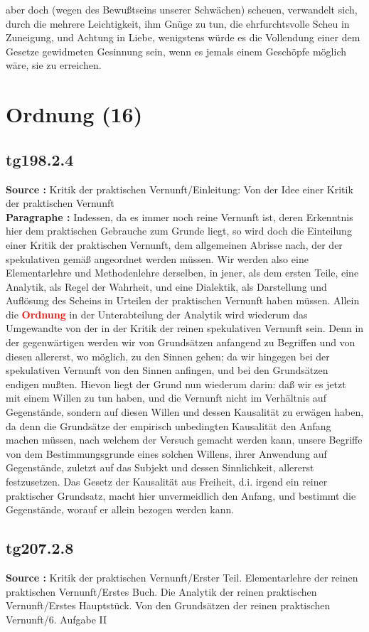 \documentclass[a4paper,12pt,twoside]{book}
\newcommand{\match}[1]{\textcolor{red}{\textbf{#1}}}
\newcommand{\unnumberedsection}[1]{
	\section*{#1}
	\addcontentsline{toc}{section}{#1}
	\markright{#1}
}
\begin{document}
aber doch (wegen des Bewußtseins unserer Schwächen) scheuen, verwandelt sich, durch die mehrere Leichtigkeit, ihm Gnüge zu tun, die ehrfurchtsvolle Scheu in Zuneigung, und Achtung in Liebe, wenigstens würde es die Vollendung einer dem Gesetze gewidmeten Gesinnung sein, wenn es jemals einem Geschöpfe möglich wäre, sie zu erreichen. 
	
	\unnumberedsection{Ordnung (16)} 
	\subsection*{tg198.2.4} 
	\textbf{Source : }Kritik der praktischen Vernunft/Einleitung: Von der Idee einer Kritik der praktischen Vernunft\\  
	
	\noindent\textbf{Paragraphe : }Indessen, da es immer noch reine Vernunft ist, deren Erkenntnis hier dem praktischen Gebrauche zum Grunde liegt, so wird doch die Einteilung einer Kritik der praktischen Vernunft, dem allgemeinen Abrisse nach, der der spekulativen gemäß angeordnet werden müssen. Wir werden also eine Elementarlehre und Methodenlehre derselben, in jener, als dem ersten Teile, eine Analytik, als Regel der Wahrheit, und eine Dialektik, als Darstellung und Auflösung des Scheins in Urteilen der praktischen Vernunft haben müssen. Allein die \match{Ordnung} in der Unterabteilung der Analytik wird wiederum das Umgewandte von der in der Kritik der reinen spekulativen Vernunft sein. Denn in der gegenwärtigen werden wir von Grundsätzen anfangend zu Begriffen und von diesen allererst, wo möglich, zu den Sinnen gehen; da wir hingegen bei der spekulativen Vernunft von den Sinnen anfingen, und bei den Grundsätzen endigen mußten. Hievon liegt der Grund nun wiederum darin: daß wir es jetzt mit einem Willen zu tun haben, und die Vernunft nicht im Verhältnis auf Gegenstände, sondern auf diesen Willen und dessen Kausalität zu erwägen haben, da denn die Grundsätze der empirisch unbedingten Kausalität den Anfang machen müssen, nach welchem der Versuch gemacht werden kann, unsere Begriffe von dem Bestimmungsgrunde eines solchen Willens, ihrer Anwendung auf Gegenstände, zuletzt auf das Subjekt und dessen Sinnlichkeit, allererst festzusetzen. Das Gesetz der Kausalität aus Freiheit, d.i. irgend ein reiner praktischer Grundsatz, macht hier unvermeidlich den Anfang, und bestimmt die Gegenstände, worauf er allein bezogen werden kann. 
	
	\subsection*{tg207.2.8} 
	\textbf{Source : }Kritik der praktischen Vernunft/Erster Teil. Elementarlehre der reinen praktischen Vernunft/Erstes Buch. Die Analytik der reinen praktischen Vernunft/Erstes Hauptstück. Von den Grundsätzen der reinen praktischen Vernunft/6. Aufgabe II\\  
	
\end{document}
